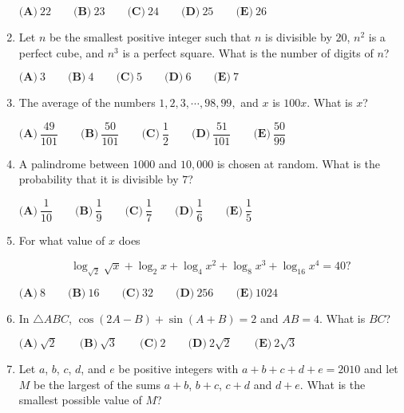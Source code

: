 \documentclass{article}
\begin{document}
\begin{enumerate}[label=\arabic*., itemsep=0.5em]
\(\textbf{(A)}\ 22 \qquad \textbf{(B)}\ 23 \qquad \textbf{(C)}\ 24 \qquad \textbf{(D)}\ 25 \qquad \textbf{(E)}\ 26\)\par \vspace{0.5em}\item Let \(n\) be the smallest positive integer such that \(n\) is divisible by \(20\), \(n^2\) is a perfect cube, and \(n^3\) is a perfect square. What is the number of digits of \(n\)?

\(\textbf{(A)}\ 3 \qquad \textbf{(B)}\ 4 \qquad \textbf{(C)}\ 5 \qquad \textbf{(D)}\ 6 \qquad \textbf{(E)}\ 7\)\par \vspace{0.5em}\item The average of the numbers \(1, 2, 3,\cdots, 98, 99,\) and \(x\) is \(100x\). What is \(x\)?

\(\textbf{(A)}\ \dfrac{49}{101} \qquad \textbf{(B)}\ \dfrac{50}{101} \qquad \textbf{(C)}\ \dfrac{1}{2} \qquad \textbf{(D)}\ \dfrac{51}{101} \qquad \textbf{(E)}\ \dfrac{50}{99}\)\par \vspace{0.5em}\item A palindrome between \(1000\) and \(10,000\) is chosen at random. What is the probability that it is divisible by \(7\)?

\(\textbf{(A)}\ \dfrac{1}{10} \qquad \textbf{(B)}\ \dfrac{1}{9} \qquad \textbf{(C)}\ \dfrac{1}{7} \qquad \textbf{(D)}\ \dfrac{1}{6} \qquad \textbf{(E)}\ \dfrac{1}{5}\)\par \vspace{0.5em}\item For what value of \(x\) does


\begin{equation*}
\log_{\sqrt{2}}\sqrt{x}+\log_{2}{x}+\log_{4}{x^2}+\log_{8}{x^3}+\log_{16}{x^4}=40?
\end{equation*}


\(\textbf{(A)}\ 8 \qquad \textbf{(B)}\ 16 \qquad \textbf{(C)}\ 32 \qquad \textbf{(D)}\ 256 \qquad \textbf{(E)}\ 1024\)\par \vspace{0.5em}\item In \(\triangle ABC\), \(\cos(2A-B)+\sin(A+B)=2\) and \(AB=4\). What is \(BC\)?

\(\textbf{(A)}\ \sqrt{2} \qquad \textbf{(B)}\ \sqrt{3} \qquad \textbf{(C)}\ 2 \qquad \textbf{(D)}\ 2\sqrt{2} \qquad \textbf{(E)}\ 2\sqrt{3}\)\par \vspace{0.5em}\item Let \(a\), \(b\), \(c\), \(d\), and \(e\) be positive integers with \(a+b+c+d+e=2010\) and let \(M\) be the largest of the sums \(a+b\), \(b+c\), \(c+d\) and \(d+e\). What is the smallest possible value of \(M\)?


\end{enumerate}
\end{document}
